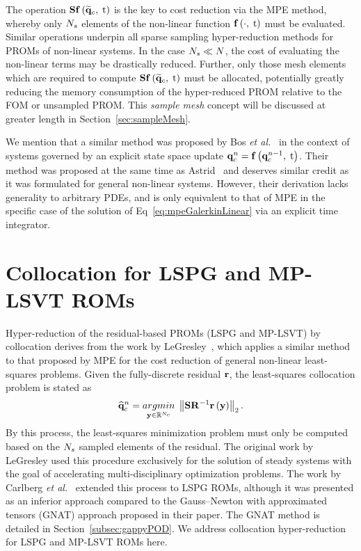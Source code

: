 The operation $\mathbf{S} \mathbf{f} \left(\mathbf{\widetilde{q}}_{c}, \; \text{t}\right)$ is the key to cost reduction via the MPE method, whereby only $N_s$ elements of the non-linear function $\mathbf{f} \left(\cdot, \; \text{t}\right)$ must be evaluated. Similar operations underpin all sparse sampling hyper-reduction methods for PROMs of non-linear systems. In the case $N_s \ll N$, the cost of evaluating the non-linear terms may be drastically reduced. Further, only those mesh elements which are required to compute $\mathbf{S} \mathbf{f} \left(\mathbf{\widetilde{q}}_{c}, \; \text{t}\right)$ must be allocated, potentially greatly reducing the memory consumption of the hyper-reduced PROM relative to the FOM or unsampled PROM. This \textit{sample mesh} concept will be discussed at greater length in Section~\ref{sec:sampleMesh}.

We mention that a similar method was proposed by Bos \textit{et al.}~\cite{Bos2004} in the context of systems governed by an explicit state space update $\mathbf{q}_{c}^{n} = \mathbf{f} \left(\mathbf{q}_{c}^{n - 1}, \; \text{t}\right)$. Their method was proposed at the same time as Astrid~\cite{Astrid2004} and deserves similar credit as it was formulated for general non-linear systems. However, their derivation lacks generality to arbitrary PDEs, and is only equivalent to that of MPE in the specific case of the solution of Eq~\ref{eq:mpeGalerkinLinear} via an explicit time integrator.

\section{Collocation for LSPG and MP-LSVT ROMs}

Hyper-reduction of the residual-based PROMs (LSPG and MP-LSVT) by collocation derives from the work by LeGresley~\cite{LeGresley2005}, which applies a similar method to that proposed by MPE for the cost reduction of general non-linear least-squares problems. Given the fully-discrete residual $\mathbf{r}$, the least-squares collocation problem is stated as
%
\begin{equation}\label{eq:collocLSPG}
	\consVecCoef^{\timeIdx} = \argmin{\dummyVec \inROne{\numConsModes}} \left\Vert \sampMat \resScaleInv \resFunc{\dummyVec} \right\Vert_2.
\end{equation}
%
By this process, the least-squares minimization problem must only be computed based on the $N_s$ sampled elements of the residual. The original work by LeGresley used this procedure exclusively for the solution of steady systems with the goal of accelerating multi-disciplinary optimization problems. The work by Carlberg \textit{et al.}~\cite{Carlberg2013} extended this process to LSPG ROMs, although it was presented as an inferior approach compared to the Gauss--Newton with approximated tensors (GNAT) approach proposed in their paper. The GNAT method is detailed in Section~\ref{subsec:gappyPOD}. We address collocation hyper-reduction for LSPG and MP-LSVT ROMs here.

